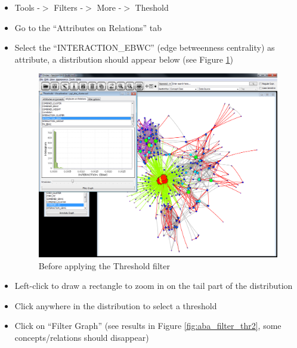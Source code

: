 \begin{itemize}
\item Tools -$>$ Filters -$>$ More -$>$ Theshold	
\item Go to the ``Attributes on Relations'' tab
\item Select the ``INTERACTION\_EBWC'' (edge betweenness centrality) as attribute, a distribution should appear below (see Figure \ref{fig:aba_filter_thr1})

\begin{figure}[H]
\centering
\includegraphics[scale=0.35]{images/Oct12/aba_filter_thr1.png} 
\caption{Before applying the Threshold filter}
\label{fig:aba_filter_thr1}
\end{figure}

\item Left-click to draw a rectangle to zoom in on the tail part of the distribution
\item Click anywhere in the distribution to select a threshold
\item Click on ``Filter Graph'' (see results in Figure \ref{fig:aba_filter_thr2}, some concepts/relations should disappear)


\end{itemize}
